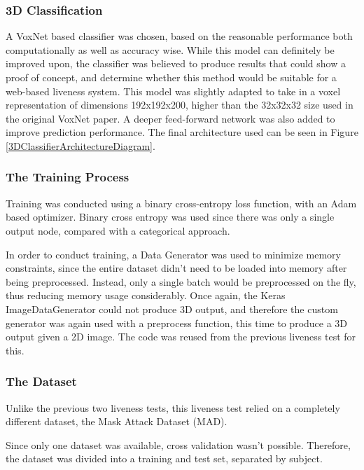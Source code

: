 \documentclass[12pt,a4paper]{article}
\begin{document}
        \subsubsection{3D Classification}
            A VoxNet based classifier was chosen, based on the reasonable performance both computationally as well as accuracy wise. 
            While this model can definitely be improved upon, the classifier was believed to produce results that could show a proof of concept,
            and determine whether this method would be suitable for a web-based liveness system. This model was slightly adapted to
            take in a voxel representation of dimensions 192x192x200, higher than the 32x32x32 size used in the original VoxNet paper.
            A deeper feed-forward network was also added to improve prediction performance.
            The final architecture used can be seen in Figure \ref{3DClassifierArchitectureDiagram}.

         

        \subsubsection{The Training Process}
            Training was conducted using a binary cross-entropy loss function, with an Adam based optimizer. Binary cross entropy was used since there was only a single output node,
            compared with a categorical approach. 


            In order to conduct training, a Data Generator was used to minimize memory constraints, since the entire dataset didn't need to be loaded into memory after being preprocessed. Instead,
            only a single batch would be preprocessed on the fly, thus reducing memory usage considerably. Once again, the Keras ImageDataGenerator could not produce 3D output, and therefore
            the custom generator was again used with a preprocess function, this time to produce a 3D output given a 2D image. The code was reused from the previous liveness test for this.

        \subsubsection{The Dataset}
            Unlike the previous two liveness tests, this liveness test relied on a completely different dataset, the Mask Attack Dataset (MAD). \cite{3DMadDataset}

            Since only one dataset was available, cross validation wasn't possible. Therefore, the dataset was divided into a training and test set, separated by subject.
\end{document}
